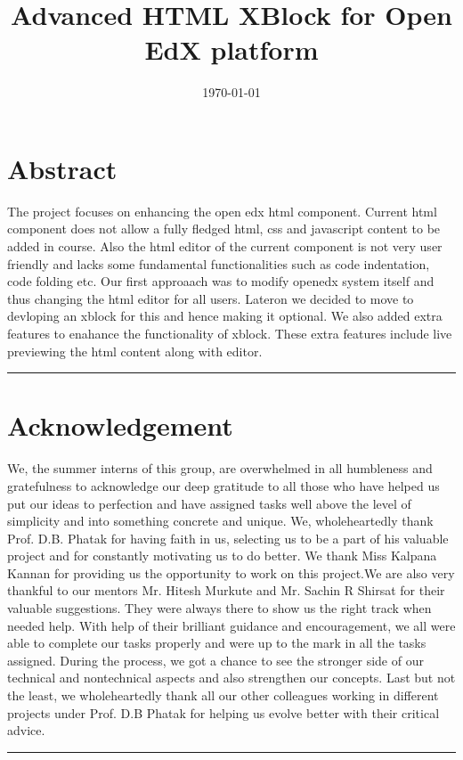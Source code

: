 \documentclass[a4paper, twosided, openany]{memoir}
\begin{document}
\pagestyle{plain}
\title{Advanced HTML XBlock for Open EdX platform}
\date{\today}

\frontmatter

\maketitle

\chapter*{Abstract}
The project focuses on enhancing the open edx html component. Current html component does not
allow a fully fledged html, css and javascript content to be added in course. Also the html editor of
the current component is not very user friendly and lacks some fundamental functionalities such as
code indentation, code folding etc. Our first approaach was to modify openedx system itself and
thus changing the html editor for all users. Lateron we decided to move to devloping an xblock for
this and hence making it optional. We also added extra features to enahance the functionality of
xblock. These extra features include live previewing the html content along with editor.\newline
\par\fancybreak{$***$}\par

\newpage

\chapter*{Acknowledgement}
	We, the summer interns of this group, are overwhelmed in all humbleness and
gratefulness to acknowledge our deep gratitude to all those who have helped us put
our ideas to perfection and have assigned tasks well above the level of simplicity and
into something concrete and unique.
We, wholeheartedly thank Prof. D.B. Phatak for having faith in us, selecting us to be
a part of his valuable project and for constantly motivating us to do better.
We thank Miss Kalpana Kannan for providing us the opportunity to work on this
project.We are also very thankful to our mentors Mr. Hitesh Murkute and Mr. Sachin R Shirsat
for their valuable suggestions. They were always there to show us the right track when needed help.
With help of their brilliant guidance and encouragement, we all were able to complete
our tasks properly and were up to the mark in all the tasks assigned. During the
process, we got a chance to see the stronger side of our technical and nontechnical
aspects and also strengthen our concepts.
Last but not the least, we wholeheartedly thank all our other colleagues working in
different projects under Prof. D.B Phatak for helping us evolve better with their critical advice.\newline
\par\fancybreak{$***$}\par
\newpage

\tableofcontents

\mainmatter










\end{document}
